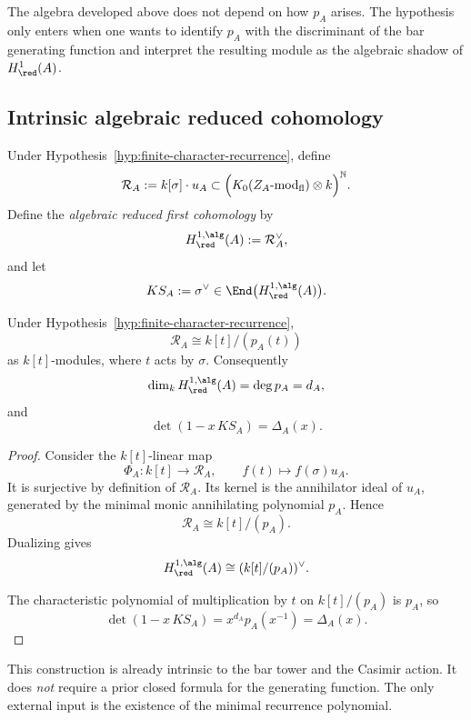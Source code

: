 \begin{remark}
The algebra developed above does not depend on how \(p_A\) arises.
The hypothesis only enters when one wants to identify \(p_A\) with the discriminant of the bar generating function and interpret the resulting module as the algebraic shadow of \(H^1_{\red}(A)\).
\end{remark}

\subsection{Intrinsic algebraic reduced cohomology}

\begin{definition}
Under Hypothesis~\ref{hyp:finite-character-recurrence}, define
\[
\mathcal R_A:=k[\sigma]\cdot u_A
\subset \Bigl(K_0(Z_A\text{-mod}_{\mathrm{fl}})\otimes k\Bigr)^{\mathbb N}.
\]
Define the \emph{algebraic reduced first cohomology} by
\[
H^{1,\alg}_{\red}(A):=\mathcal R_A^\vee,
\]
and let
\[
KS_A:=\sigma^\vee\in \End\bigl(H^{1,\alg}_{\red}(A)\bigr).
\]
\end{definition}

\begin{theorem}
\ClaimStatusProvedHere
\label{thm:minimal-intrinsic-realization}
Under Hypothesis~\ref{hyp:finite-character-recurrence},
\[
\mathcal R_A\cong k[t]/(p_A(t))
\]
as \(k[t]\)-modules, where \(t\) acts by \(\sigma\).
Consequently
\[
\dim_k H^{1,\alg}_{\red}(A)=\deg p_A=d_A,
\]
and
\[
\det(1-x\,KS_A)=\Delta_A(x).
\]
\end{theorem}

\begin{proof}
Consider the \(k[t]\)-linear map
\[
\Phi_A\colon k[t]\to \mathcal R_A,\qquad f(t)\mapsto f(\sigma)u_A.
\]
It is surjective by definition of \(\mathcal R_A\).
Its kernel is the annihilator ideal of \(u_A\), generated by the minimal monic annihilating polynomial \(p_A\).
Hence
\[
\mathcal R_A\cong k[t]/(p_A).
\]
Dualizing gives
\[
H^{1,\alg}_{\red}(A)\cong (k[t]/(p_A))^\vee.
\]

The characteristic polynomial of multiplication by \(t\) on \(k[t]/(p_A)\) is \(p_A\), so
\[
\det(1-x\,KS_A)=x^{d_A}p_A(x^{-1})=\Delta_A(x).
\]
\end{proof}

\begin{remark}
This construction is already intrinsic to the bar tower and the Casimir action.
It does \emph{not} require a prior closed formula for the generating function.
The only external input is the existence of the minimal recurrence polynomial.
\end{remark}

